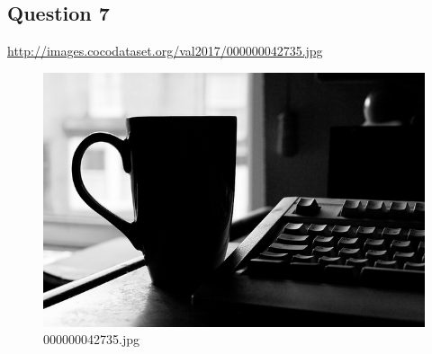 \subsection*{Question 7}
\url{http://images.cocodataset.org/val2017/000000042735.jpg}
    \begin{figure}[h]
        \centering
        \includegraphics[width=0.8\linewidth]{../image set/easy/000000042735.jpg}
        \caption{000000042735.jpg}
    \end{figure}
